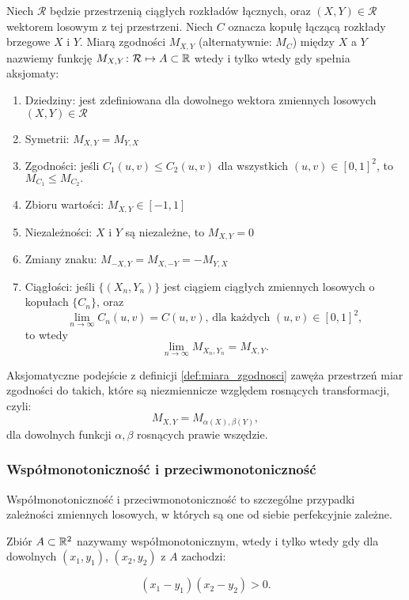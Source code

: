 \begin{df}
	Niech $\mathcal{R}$ będzie przestrzenią ciągłych rozkładów łącznych, oraz $(X, Y) \in \mathcal{R}$ wektorem losowym z tej przestrzeni. Niech $C$ oznacza kopułę łączącą rozkłady brzegowe $X$ i $Y$. Miarą zgodności $M_{X,Y}$ (alternatywnie: $M_C$) między $X$ a $Y$ nazwiemy funkcję $M_{X,Y}\colon \mathcal{R}\mapsto A\subset\mathbb{R}$ wtedy i tylko wtedy gdy spełnia aksjomaty:
	\begin{enumerate}
		\item Dziedziny: jest zdefiniowana dla dowolnego wektora zmiennych losowych $(X, Y) \in \mathcal{R}$
		\item Symetrii: $M_{X,Y}=M_{Y,X}$
		\item Zgodności: jeśli $C_1(u,v) \leqslant C_2(u,v)$ dla wszystkich $(u, v)\in[0,1]^2$, to $M_{C_1} \leqslant M_{C_2}.$
		\item Zbioru wartości: $M_{X,Y}\in[-1,1]$
		\item Niezależności: $X$ i $Y$ są niezależne, to $M_{X,Y}=0$
		\item Zmiany znaku: $M_{-X,Y}=M_{X,-Y}=-M_{Y,X}$
		\item Ciągłości: jeśli $\{(X_n,Y_n)\}$ jest ciągiem ciągłych zmiennych losowych o kopułach $\{C_n\}$, oraz 
		$$ \lim\limits_{n\to\infty} C_n(u, v) =C(u, v)\text{, dla każdych }(u, v)\in[0,1]^2,$$
		to wtedy
		$$ \lim\limits_{n\to\infty}M_{X_n,Y_n}=M_{X,Y}.$$
	\end{enumerate}
	\label{def:miara_zgodnosci}		
\end{df}

Aksjomatyczne podejście z definicji \ref{def:miara_zgodnosci} zawęża przestrzeń miar zgodności do takich, które są niezmiennicze względem rosnących transformacji, czyli:
$$ M_{X,Y} = M_{\alpha(X), \beta(Y)},$$
dla dowolnych funkcji $\alpha,\beta$ rosnących prawie wszędzie.\\

\subsubsection{Współmonotoniczność i przeciwmonotoniczność}
Współmonotoniczność i przeciwmonotoniczność to szczególne przypadki zależności zmiennych losowych, w których są one od siebie perfekcyjnie zależne.

\begin{df}
	Zbiór $A \subset \mathbb{R}^2$ nazywamy współmonotonicznym, wtedy i tylko wtedy gdy dla dowolnych $(x_1, y_1)$, $(x_2, y_2)$ z $A$ zachodzi:
	
	$$ (x_1 - y_1)(x_2 - y_2) >0.$$
\end{df}

